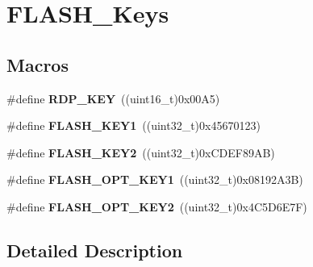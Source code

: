 \hypertarget{group___f_l_a_s_h___keys}{\section{F\-L\-A\-S\-H\-\_\-\-Keys}
\label{group___f_l_a_s_h___keys}
}
\subsection*{Macros}
\begin{DoxyCompactItemize}
\item 
\hypertarget{group___f_l_a_s_h___keys_gae497135e5528d69274bf8daf7f077f23}{\#define {\bfseries R\-D\-P\-\_\-\-K\-E\-Y}~((uint16\-\_\-t)0x00\-A5)}\label{group___f_l_a_s_h___keys_gae497135e5528d69274bf8daf7f077f23}

\item 
\hypertarget{group___f_l_a_s_h___keys_gafd77e7bf91765d891ce63e2f0084b019}{\#define {\bfseries F\-L\-A\-S\-H\-\_\-\-K\-E\-Y1}~((uint32\-\_\-t)0x45670123)}\label{group___f_l_a_s_h___keys_gafd77e7bf91765d891ce63e2f0084b019}

\item 
\hypertarget{group___f_l_a_s_h___keys_gaee83d0f557e158da52f4a205db6b60a7}{\#define {\bfseries F\-L\-A\-S\-H\-\_\-\-K\-E\-Y2}~((uint32\-\_\-t)0x\-C\-D\-E\-F89\-A\-B)}\label{group___f_l_a_s_h___keys_gaee83d0f557e158da52f4a205db6b60a7}

\item 
\hypertarget{group___f_l_a_s_h___keys_gacebe54ff9ff12abcf0e4d3e697b2f116}{\#define {\bfseries F\-L\-A\-S\-H\-\_\-\-O\-P\-T\-\_\-\-K\-E\-Y1}~((uint32\-\_\-t)0x08192\-A3\-B)}\label{group___f_l_a_s_h___keys_gacebe54ff9ff12abcf0e4d3e697b2f116}

\item 
\hypertarget{group___f_l_a_s_h___keys_ga636d46db38e376f0483eed4b7346697c}{\#define {\bfseries F\-L\-A\-S\-H\-\_\-\-O\-P\-T\-\_\-\-K\-E\-Y2}~((uint32\-\_\-t)0x4\-C5\-D6\-E7\-F)}\label{group___f_l_a_s_h___keys_ga636d46db38e376f0483eed4b7346697c}

\end{DoxyCompactItemize}


\subsection{Detailed Description}

